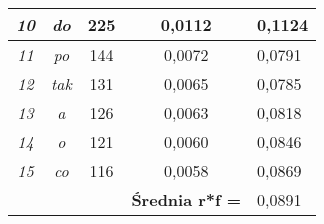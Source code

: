 \documentclass[a4paper]{article}
\begin{document}
\begin{table}
\begin{tabular}{ccc|c|l|}
\multicolumn{1}{|c|}{\textit{10}}                & \multicolumn{1}{c|}{\textit{do}}     & 225                               & 0,0112                                     & 0,1124 \\ \hline
\multicolumn{1}{|c|}{\textit{11}}                & \multicolumn{1}{c|}{\textit{po}}     & 144                               & 0,0072                                     & 0,0791 \\ \hline
\multicolumn{1}{|c|}{\textit{12}}                & \multicolumn{1}{c|}{\textit{tak}}    & 131                               & 0,0065                                     & 0,0785 \\ \hline
\multicolumn{1}{|c|}{\textit{13}}                & \multicolumn{1}{c|}{\textit{a}}      & 126                               & 0,0063                                     & 0,0818 \\ \hline
\multicolumn{1}{|c|}{\textit{14}}                & \multicolumn{1}{c|}{\textit{o}}      & 121                               & 0,0060                                     & 0,0846 \\ \hline
\multicolumn{1}{|c|}{\textit{15}}                & \multicolumn{1}{c|}{\textit{co}}     & 116                               & 0,0058                                     & 0,0869 \\ \hline
\multicolumn{1}{l}{}                             &                                      &                                   & \textbf{Średnia r*f =}                     & 0,0891 \\ \cline{4-5} 
\end{tabular}
\end{table}
\end{document}

